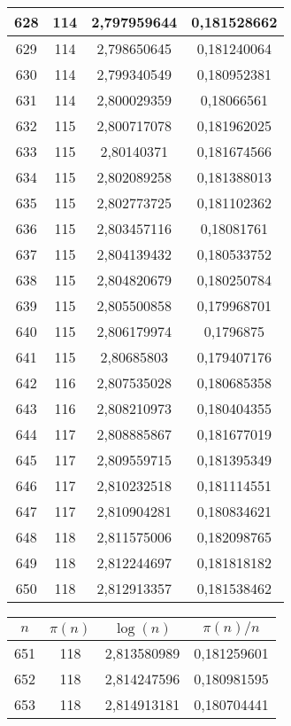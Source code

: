 {\begin{minipage}[!h]{0.45\textwidth}
\begin{longtable}{cccc}
628 & 114 & 2,797959644 & 0,181528662 \\ \hline
629 & 114 & 2,798650645 & 0,181240064 \\ \hline
630 & 114 & 2,799340549 & 0,180952381 \\ \hline
631 & 114 & 2,800029359 & 0,18066561 \\ \hline
632 & 115 & 2,800717078 & 0,181962025 \\ \hline
633 & 115 & 2,80140371 & 0,181674566 \\ \hline
634 & 115 & 2,802089258 & 0,181388013 \\ \hline
635 & 115 & 2,802773725 & 0,181102362 \\ \hline
636 & 115 & 2,803457116 & 0,18081761 \\ \hline
637 & 115 & 2,804139432 & 0,180533752 \\ \hline
638 & 115 & 2,804820679 & 0,180250784 \\ \hline
639 & 115 & 2,805500858 & 0,179968701 \\ \hline
640 & 115 & 2,806179974 & 0,1796875 \\ \hline
641 & 115 & 2,80685803 & 0,179407176 \\ \hline
642 & 116 & 2,807535028 & 0,180685358 \\ \hline
643 & 116 & 2,808210973 & 0,180404355 \\ \hline
644 & 117 & 2,808885867 & 0,181677019 \\ \hline
645 & 117 & 2,809559715 & 0,181395349 \\ \hline
646 & 117 & 2,810232518 & 0,181114551 \\ \hline
647 & 117 & 2,810904281 & 0,180834621 \\ \hline
648 & 118 & 2,811575006 & 0,182098765 \\ \hline
649 & 118 & 2,812244697 & 0,181818182 \\ \hline
650 & 118 & 2,812913357 & 0,181538462 \\ \hline
\end{longtable}
\end{minipage}
\begin{minipage}[!h]{0.45\textwidth}\centering
\tiny
\begin{longtable}{cccc} \hline
\(n\) & \(\pi(n)\) & \(\log(n)\) & \(\pi(n)/n\) \\ \hline
651 & 118 & 2,813580989 & 0,181259601 \\ \hline
652 & 118 & 2,814247596 & 0,180981595 \\ \hline
653 & 118 & 2,814913181 & 0,180704441 \\ \hline

\end{longtable}
\end{minipage}}
